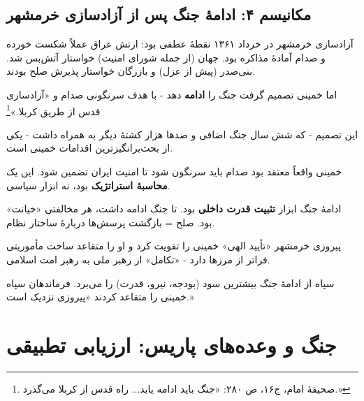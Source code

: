\documentclass[12pt,a4paper]{book}
\newcommand{\keyword}[1]{\textbf{\textcolor{cPrimary}{#1}}}
\begin{document}
\subsection{مکانیسم ۴: ادامهٔ جنگ پس از آزادسازی خرمشهر}

\begin{noteBox}
آزادسازی خرمشهر در خرداد ۱۳۶۱ نقطهٔ عطفی بود: ارتش عراق عملاً شکست خورده و صدام آمادهٔ مذاکره بود. جهان (از جمله شورای امنیت) خواستار آتش‌بس شد. بنی‌صدر (پیش از عزل) و بازرگان خواستار پذیرش صلح بودند.

اما خمینی تصمیم گرفت جنگ را \keyword{ادامه} دهد - با هدف سرنگونی صدام و «آزادسازی قدس از طریق کربلا.»\footnote{صحیفهٔ امام، ج۱۶، ص ۲۸۰: «جنگ باید ادامه یابد... راه قدس از کربلا می‌گذرد.»}

این تصمیم - که شش سال جنگ اضافی و صدها هزار کشتهٔ دیگر به همراه داشت - یکی از بحث‌برانگیزترین اقدامات خمینی است.
\end{noteBox}

\begin{principleBox}
\begin{description}[style=nextline, font=\bfseries\color{cPrimary}]
    \item[تز ۱ (صداقت + اجبار):] خمینی واقعاً معتقد بود صدام باید سرنگون شود تا امنیت ایران تضمین شود. این یک \keyword{محاسبهٔ استراتژیک} بود، نه ابزار سیاسی.

    \item[تز ۲ (خدعه):] ادامهٔ جنگ ابزار \keyword{تثبیت قدرت داخلی} بود. تا جنگ ادامه داشت، هر مخالفتی «خیانت» بود. صلح = بازگشت پرسش‌ها دربارهٔ ساختار نظام.

    \item[تز ۳ (تکامل):] پیروزی خرمشهر «تأیید الهی» خمینی را تقویت کرد و او را متقاعد ساخت مأموریتی فراتر از مرزها دارد - «تکامل» از رهبر ملی به رهبر امت اسلامی.

    \item[تز ۴ (نخبگان):] سپاه از ادامهٔ جنگ بیشترین سود (بودجه، نیرو، قدرت) را می‌برد. فرماندهان سپاه خمینی را متقاعد کردند «پیروزی نزدیک است.»
\end{description}
\end{principleBox}

\section{جنگ و وعده‌های پاریس: ارزیابی تطبیقی}
\end{document}
